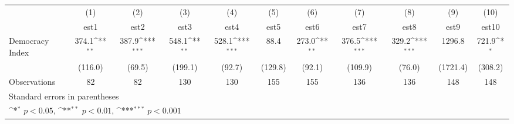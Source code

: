 {
\def\sym#1{\ifmmode^{#1}\else\(^{#1}\)\fi}
\begin{tabular}{l*{10}{c}}
\hline\hline
                    &\multicolumn{1}{c}{(1)}         &\multicolumn{1}{c}{(2)}         &\multicolumn{1}{c}{(3)}         &\multicolumn{1}{c}{(4)}         &\multicolumn{1}{c}{(5)}         &\multicolumn{1}{c}{(6)}         &\multicolumn{1}{c}{(7)}         &\multicolumn{1}{c}{(8)}         &\multicolumn{1}{c}{(9)}         &\multicolumn{1}{c}{(10)}         \\
                    &        est1         &        est2         &        est3         &        est4         &        est5         &        est6         &        est7         &        est8         &        est9         &       est10         \\
\hline
Democracy Index     &       374.1\sym{**} &       387.9\sym{***}&       548.1\sym{**} &       528.1\sym{***}&        88.4         &       273.0\sym{**} &       376.5\sym{***}&       329.2\sym{***}&      1296.8         &       721.9\sym{*}  \\
                    &     (116.0)         &      (69.5)         &     (199.1)         &      (92.7)         &     (129.8)         &      (92.1)         &     (109.9)         &      (76.0)         &    (1721.4)         &     (308.2)         \\
\hline
Observations        &          82         &          82         &         130         &         130         &         155         &         155         &         136         &         136         &         148         &         148         \\
\hline\hline
\multicolumn{11}{l}{\footnotesize Standard errors in parentheses}\\
\multicolumn{11}{l}{\footnotesize \sym{*} \(p<0.05\), \sym{**} \(p<0.01\), \sym{***} \(p<0.001\)}\\
\end{tabular}
}

